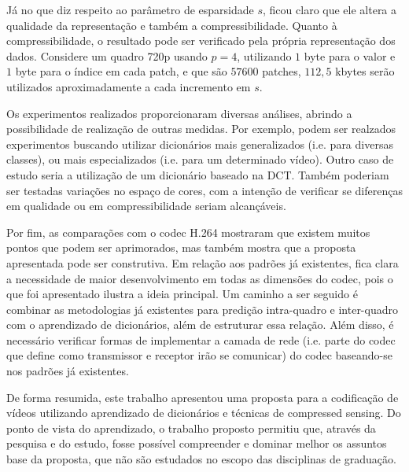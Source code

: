 \documentclass[cic,tc]{iiufrgs}
\begin{document}
Já no que diz respeito ao parâmetro de esparsidade $s$, ficou claro que ele altera a qualidade da representação 
e também a compressibilidade.
Quanto à compressibilidade, o resultado pode ser verificado pela própria representação dos dados.
Considere um quadro 720p usando $p=4$, utilizando $1$ byte para o valor e $1$ byte para o índice em cada 
patch, e que são $57600$ patches, $112,5$ kbytes serão utilizados aproximadamente a cada incremento
em $s$.

Os experimentos realizados proporcionaram diversas análises,
abrindo a possibilidade de realização de outras medidas.
Por exemplo, podem ser realzados experimentos buscando 
utilizar dicionários mais generalizados (i.e. para diversas classes),
ou mais especializados (i.e. para um determinado vídeo). 
Outro caso de estudo seria a utilização de um dicionário baseado na DCT.
Também poderiam ser testadas variações no espaço de cores,
com a intenção de verificar se diferenças em qualidade ou 
em compressibilidade seriam alcançáveis.

Por fim, as comparações com o codec H.264 mostraram que existem muitos pontos que podem ser 
aprimorados, mas também mostra que a proposta apresentada pode ser construtiva.
Em relação aos padrões já existentes, fica clara a necessidade de maior desenvolvimento em 
todas as dimensões do codec, pois o que foi apresentado ilustra a ideia principal.
Um caminho a ser seguido é combinar as metodologias já existentes para predição intra-quadro 
e inter-quadro com o aprendizado de dicionários, além de estruturar essa relação.
Além disso, é necessário verificar formas de implementar a camada de rede 
(i.e. parte do codec que define como transmissor e receptor irão se comunicar) 
do codec baseando-se 
nos padrões já existentes.

De forma resumida, este trabalho apresentou uma proposta para a codificação de vídeos 
utilizando aprendizado de dicionários e técnicas de compressed sensing.
Do ponto de vista do aprendizado, o trabalho proposto permitiu que, 
através da pesquisa e do estudo, fosse possível compreender e dominar 
melhor os assuntos base da proposta, que não são estudados no escopo das disciplinas de graduação.


% 
\end{document}
